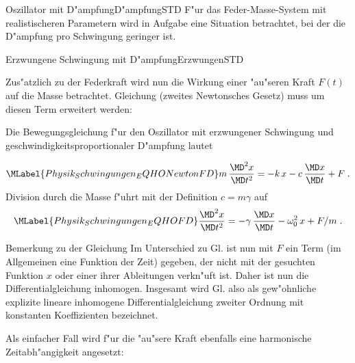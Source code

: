 \begin{MXContent}{Oszillator mit D"ampfung}{D"ampfung}{STD}
F"ur das Feder-Masse-System mit realistischeren Parametern wird in Aufgabe
eine Situation betrachtet, bei der die D"ampfung pro Schwingung geringer ist.

\end{MXContent}


\begin{MXContent}{Erzwungene Schwingung mit D"ampfung}{Erzwungen}{STD}%

Zus"atzlich zu der Federkraft wird nun die Wirkung einer "au"seren Kraft $F(t)$ auf die Masse betrachtet. Gleichung  (zweites Newtonsches Gesetz) muss um diesen Term erweitert werden:

\begin{MInfo}
Die Bewegungsgleichung f"ur den Oszillator mit erzwungener Schwingung und geschwindigkeitsproportionaler D"ampfung lautet

\begin{equation}\MLabel{Physik_Schwingungen_EQHONewtonFD}
  m\, \frac{\MD^2 x }{\MD t^2} = -k\,x -c\, \frac{\MD x }{\MD t} +  F  \; .
\end{equation}
Division durch die Masse f"uhrt mit der Definition $c=m\gamma$ auf
\begin{equation}\MLabel{Physik_Schwingungen_EQHOFD}
  \frac{\MD^2 x }{\MD t^2} = - \gamma \, \frac{\MD x }{\MD t} - \omega_0^2\,x +  F/m  \; .
\end{equation}

\end{MInfo}

  \begin{MHint}{Bemerkung zu der Gleichung}
  Im Unterschied zu Gl.  ist nun mit $F$ ein Term (im Allgemeinen eine Funktion der Zeit) gegeben, der nicht mit der gesuchten Funktion $x$ oder einer ihrer Ableitungen verkn"uft ist. Daher ist nun die Differentialgleichung inhomogen. Insgesamt wird Gl.  also als gew"ohnliche explizite lineare inhomogene Differentialgleichung zweiter Ordnung mit konstanten Koeffizienten bezeichnet.
  \end{MHint}


Als einfacher Fall wird f"ur die "au"sere Kraft ebenfalls eine harmonische Zeitabh"angigkeit angesetzt:


\end{MXContent}
